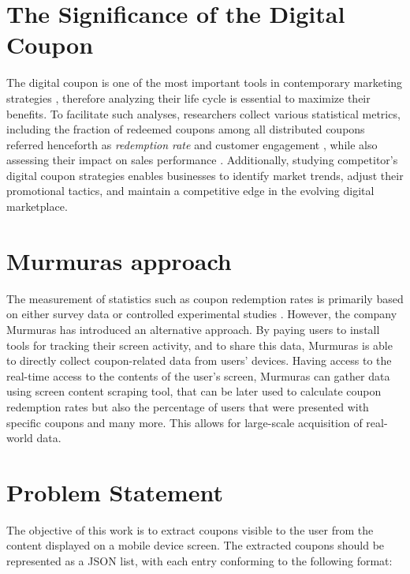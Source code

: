 \documentclass[licencjacka,en]{pracamgr}
\begin{document}
\section{The Significance of the Digital Coupon}
The digital coupon is one of the most important tools in contemporary marketing strategies \cite{targeted_reminders}, therefore analyzing their life cycle is essential to maximize their benefits. To facilitate such analyses, researchers collect various statistical metrics, including the fraction of redeemed coupons among all distributed coupons referred henceforth as \emph{redemption rate} \cite{danaher2015} and customer engagement \cite{jayadharshini2023}, while also assessing their impact on sales performance \cite{jayadharshini2023}.  Additionally, studying competitor's digital coupon strategies enables businesses to identify market trends, adjust their promotional tactics, and maintain a competitive edge in the evolving digital marketplace.

\section{Murmuras approach}
The measurement of statistics such as coupon redemption rates is primarily based on either survey data \cite{nayal2021} or controlled experimental studies \cite{danaher2015}. However, the company Murmuras \cite{murmuras} has introduced an alternative approach. By paying users to install tools for tracking their screen activity, and to share this data, Murmuras is able to directly collect coupon-related data from users' devices. Having access to the real-time access to the contents of the user's screen, Murmuras can gather data using screen content scraping tool, that can be later used to calculate coupon redemption rates but also the percentage of users that were presented with specific coupons and many more. This allows for large-scale acquisition of real-world data.

\section{Problem Statement} \label{sec:coupon_model}

The objective of this work is to extract coupons visible to the user from the content displayed on a mobile device screen. The extracted coupons should be represented as a JSON list, with each entry conforming to the following format:
\end{document}
